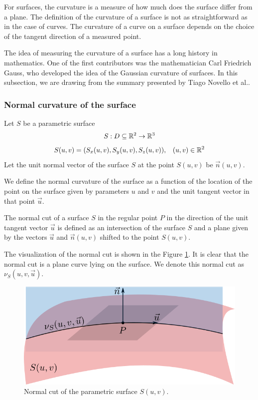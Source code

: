 For surfaces, the curvature is a measure of how much does the surface differ from a 
plane. The definition of the curvature of a surface is not as straightforward
as in the case of curves. The curvature of a curve on a surface depends on the 
choice of the tangent direction of a measured point.

The idea of measuring the curvature of a surface has a long history in mathematics.
One of the first contributors was the mathematician Carl Friedrich Gauss, who developed
the idea of the Gaussian curvature of surfaces. In this subsection, we are drawing from
the summary presented by Tiago Novello et al.\cite{novello2021differential}.

\subsubsection*{Normal curvature of the surface}

Let $S$ be a parametric surface $$S: D \subseteq \mathbb{R}^2 \to \mathbb{R}^3$$ 
$$S(u, v) = (S_x(u,v), S_y(u,v), S_z(u,v)), \hspace{3mm} (u,v)\in \mathbb{R}^2$$
Let the unit normal vector of the surface $S$ at the point $S(u, v)$ be $\vec{n}(u, v)$.

We define the normal curvature of the surface as a function of the location of the point
on the surface given by parameters $u$ and $v$ and the unit tangent vector in that point $\vec{u}$. 

\begin{definition}
The normal cut of a surface $S$ in the regular point $P$ in the direction of the unit tangent vector 
$\vec{u}$ is defined as an intersection of the surface $S$ and a plane
given by the vectors $\vec{u}$ and $\vec{n}(u, v)$ shifted to 
the point $S(u, v)$. 
\end{definition}

The visualization of the normal cut is shown in the Figure \ref{img:14}.
It is clear that the
normal cut is a plane curve lying on the surface. We denote this normal cut as $\nu_S(u, v, \vec{u})$.

\begin{figure}
    \centerline{\includegraphics[scale=0.5]{images/img14}}
    \caption[Normal cut]
    {Normal cut of the parametric surface $S(u,v)$.}
    \label{img:14}
\end{figure}

